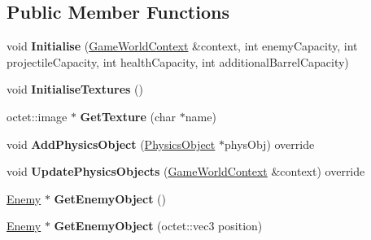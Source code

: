 \subsection*{Public Member Functions}
\begin{DoxyCompactItemize}
\item 
\hypertarget{class_arena_1_1_object_pool_afb3f50d1f2e0e15f2ed7cb8d0b453271}{void {\bfseries Initialise} (\hyperlink{struct_arena_1_1_game_world_context}{Game\+World\+Context} \&context, int enemy\+Capacity, int projectile\+Capacity, int health\+Capacity, int additional\+Barrel\+Capacity)}\label{class_arena_1_1_object_pool_afb3f50d1f2e0e15f2ed7cb8d0b453271}

\item 
\hypertarget{class_arena_1_1_object_pool_a87fe95adfb9a684909a68a5b8916b8c2}{void {\bfseries Initialise\+Textures} ()}\label{class_arena_1_1_object_pool_a87fe95adfb9a684909a68a5b8916b8c2}

\item 
\hypertarget{class_arena_1_1_object_pool_ab0e0697eaf1b590f7911b8b4a7e416b0}{octet\+::image $\ast$ {\bfseries Get\+Texture} (char $\ast$name)}\label{class_arena_1_1_object_pool_ab0e0697eaf1b590f7911b8b4a7e416b0}

\item 
\hypertarget{class_arena_1_1_object_pool_a1f79805449ee86c3e7baef01fda3f465}{void {\bfseries Add\+Physics\+Object} (\hyperlink{class_arena_1_1_physics_object}{Physics\+Object} $\ast$phys\+Obj) override}\label{class_arena_1_1_object_pool_a1f79805449ee86c3e7baef01fda3f465}

\item 
\hypertarget{class_arena_1_1_object_pool_aba06874cee24710afe4bcf565cdee704}{void {\bfseries Update\+Physics\+Objects} (\hyperlink{struct_arena_1_1_game_world_context}{Game\+World\+Context} \&context) override}\label{class_arena_1_1_object_pool_aba06874cee24710afe4bcf565cdee704}

\item 
\hypertarget{class_arena_1_1_object_pool_a0544bc5a27104c9ca2f5bece1b364ea6}{\hyperlink{class_arena_1_1_enemy}{Enemy} $\ast$ {\bfseries Get\+Enemy\+Object} ()}\label{class_arena_1_1_object_pool_a0544bc5a27104c9ca2f5bece1b364ea6}

\item 
\hypertarget{class_arena_1_1_object_pool_a2b60f0da17508f69fef47e38727f0d92}{\hyperlink{class_arena_1_1_enemy}{Enemy} $\ast$ {\bfseries Get\+Enemy\+Object} (octet\+::vec3 position)}\label{class_arena_1_1_object_pool_a2b60f0da17508f69fef47e38727f0d92}


\end{DoxyCompactItemize}
